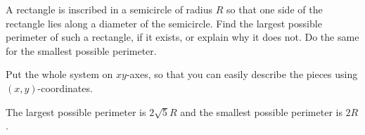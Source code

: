 \begin{Mquestion}[2006H]
 A rectangle is inscribed in a semicircle of radius $R$
so that one side of the rectangle lies along a diameter of the semicircle.
Find the largest possible perimeter of such a rectangle, if it exists,
or explain why it does not. Do the same for the smallest possible perimeter.
\begin{center}\end{center}
\end{Mquestion}
\begin{hint}
Put the whole system on $xy$-axes, so that you can easily describe the pieces using $(x,y)$-coordinates.
\end{hint}
\begin{answer}
The largest possible perimeter is $2\sqrt{5}R$ and
the smallest possible perimeter is $2R$.
\end{answer}
